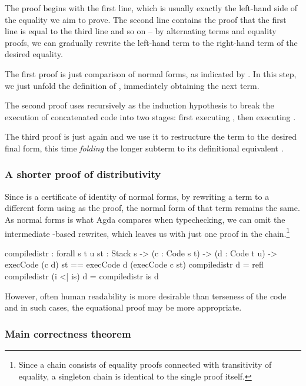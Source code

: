 \noindent The proof begins with the first line, which is usually exactly the
left-hand side of the equality we aim
to prove.  The second line contains the proof that the first line is equal to
the third line and so on -- by alternating terms and equality proofs, we can
gradually rewrite the left-hand term to the right-hand term of the desired
equality.

The first proof is just comparison of normal forms, as indicated by
. In this step, we just unfold the definition of ,
immediately obtaining the next term.

The second proof uses  recursively as the induction
hypothesis to break the execution of concatenated code into two stages: first
executing , then executing .

The third proof is just  again and we use it to restructure the
term to the desired final form, this time \emph{folding} the longer
subterm to its definitional equivalent .

\subsubsection{A shorter proof of distributivity}

Since  is a certificate of identity of normal forms, by rewriting
a term to a different form using  as the proof, the normal form of
that term remains the same. As normal forms is what Agda compares when typechecking,
we can omit the intermediate -based rewrites, which leaves us
with just one proof in the chain.\footnote{Since a chain consists of equality
proofs connected with transitivity of equality, a singleton chain is identical
to the single proof itself.}

\begin{code}
  compile\-distr : forall {s t u} {st : Stack s}
    -> (c : Code s t) -> (d : Code t u)
    -> execCode (c \app d) st == execCode d (execCode c st)
  compile\-distr \nil d = refl
  compile\-distr (i <| is) d = compile\-distr is d
\end{code}

\noindent However, often human readability is more desirable than terseness of
the code and in such cases, the equational proof may be more appropriate.

\subsubsection{Main correctness theorem}

